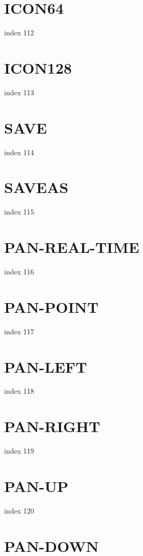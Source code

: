 \documentclass[10pt]{report}
\begin{document}
\section{ICON64}

index 112

\section{ICON128}

index 113

\section{SAVE}

index 114

\section{SAVEAS}

index 115

\section{PAN-REAL-TIME}

index 116

\section{PAN-POINT}

index 117

\section{PAN-LEFT}

index 118

\section{PAN-RIGHT}

index 119

\section{PAN-UP}

index 120

\section{PAN-DOWN}
\end{document}
